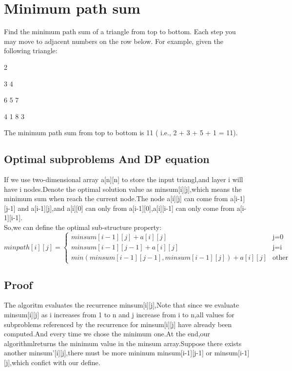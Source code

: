 \documentclass[]{article}
\begin{document}
\section{Minimum path sum}
Find the minimum path sum of a triangle from top to bottom. Each step you may move to adjacent numbers on the row below.
For example, given the following triangle:

\centerline{2}
\centerline{3 4}
\centerline{6 5 7}
\centerline{4 1 8 3}

The minimum path sum from top to bottom is 11 ( i.e., 2 + 3 + 5 + 1 = 11).
\subsection{Optimal subproblems And DP equation}
If we use two-dimensional array a[n][n] to store the input triangl,and layer i will have i nodes.Denote the optimal solution value as minsum[i][j],which means the minimum sum when reach the current node.The node a[i][j] can come from a[i-1][j-1] and a[i-1][j],and a[i][0] can only from a[i-1][0],a[i][i-1] can only come from a[i-1][i-1].\\
So,we can define the optimal sub-structure property:\\
	$$
	minpath[i][j] = \begin{cases}
	minsum[i-1][j]+a[i][j] & \text{j=0} \\
	minsum[i-1][j-1]+a[i][j] & \text{j=i} \\
	min(minsum[i-1][j-1],minsum[i-1][j])+a[i][j] & \text{other}
	\end{cases}
	$$

\subsection{Proof}
The algoritm evaluates the recurrence minsum[i][j],Note that since we evaluate minsum[i][j] as i increases from 1 to n and j increase from i to n,all values for subproblems referenced by the recurrence for minsum[i][j] have already been computed.And every time we chose the minimum one.At the end,our algorithmlreturns the minimum value in the minsum array.Suppose there exists another minsum'[i][j],there must be more mininum minsum[i-1][j-1] or minsum[i-1][j],which confict with our define.
\end{document}
